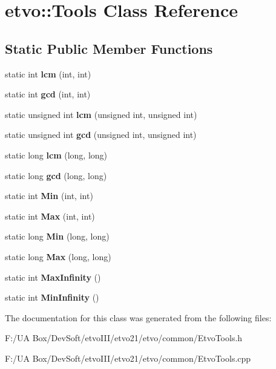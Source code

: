 \section{etvo\+:\+:Tools Class Reference}
\label{classetvo_1_1_tools}
\subsection*{Static Public Member Functions}
\begin{DoxyCompactItemize}
\item 
\mbox{\label{classetvo_1_1_tools_a007eae069bc279d200220cd46108dde8}} 
static int {\bfseries lcm} (int, int)
\item 
\mbox{\label{classetvo_1_1_tools_ac11c7af27f157cc44e54be67060b599c}} 
static int {\bfseries gcd} (int, int)
\item 
\mbox{\label{classetvo_1_1_tools_a6327a4b93e833c88d0d4ae418b604911}} 
static unsigned int {\bfseries lcm} (unsigned int, unsigned int)
\item 
\mbox{\label{classetvo_1_1_tools_af21fd3ae93437bbe379e7e595b39a611}} 
static unsigned int {\bfseries gcd} (unsigned int, unsigned int)
\item 
\mbox{\label{classetvo_1_1_tools_accd66db351a991625493a5c6855dae7b}} 
static long {\bfseries lcm} (long, long)
\item 
\mbox{\label{classetvo_1_1_tools_af800b53688965079d488c282f2bd3b2c}} 
static long {\bfseries gcd} (long, long)
\item 
\mbox{\label{classetvo_1_1_tools_ac00251b841cb606ca9dad9df961f5dec}} 
static int {\bfseries Min} (int, int)
\item 
\mbox{\label{classetvo_1_1_tools_ad3587e014b1ca17bfdf90574f30f9496}} 
static int {\bfseries Max} (int, int)
\item 
\mbox{\label{classetvo_1_1_tools_a965ef2a48fa3fca1aaf0e358f4f836d7}} 
static long {\bfseries Min} (long, long)
\item 
\mbox{\label{classetvo_1_1_tools_a58ab0eeed0376545cb6ac98e5e4ba421}} 
static long {\bfseries Max} (long, long)
\item 
\mbox{\label{classetvo_1_1_tools_a16bfa8a611a294e3974a78e494ae948e}} 
static int {\bfseries Max\+Infinity} ()
\item 
\mbox{\label{classetvo_1_1_tools_a62e55350bff19dc41aba535be5d1b41d}} 
static int {\bfseries Min\+Infinity} ()
\end{DoxyCompactItemize}


The documentation for this class was generated from the following files\+:\begin{DoxyCompactItemize}
\item 
F\+:/\+U\+A Box/\+Dev\+Soft/etvo\+I\+I\+I/etvo21/etvo/common/Etvo\+Tools.\+h\item 
F\+:/\+U\+A Box/\+Dev\+Soft/etvo\+I\+I\+I/etvo21/etvo/common/Etvo\+Tools.\+cpp\end{DoxyCompactItemize}
